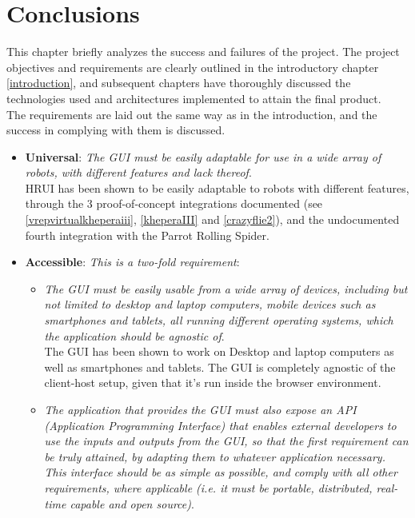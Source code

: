 \chapter{Conclusions} \label{conclusions}
This chapter briefly analyzes the success and failures of the project. The project objectives and requirements are clearly 
outlined in the introductory chapter \ref{introduction}, and subsequent chapters have thoroughly discussed the technologies 
used and architectures implemented to attain the final product.\\

The requirements are laid out the same way as in the introduction, and the success in complying with them is discussed.
\begin{itemize}
	\item \textbf{Universal}: \textit{The GUI must be easily adaptable for use in a wide array of robots, with different 
	features and lack thereof}.\\

	HRUI has been shown to be easily adaptable to robots with different features, through the 3 proof-of-concept 
	integrations documented (see \ref{vrepvirtualkheperaiii}, \ref{kheperaIII} and \ref{crazyflie2}), and the undocumented 
	fourth integration with the Parrot Rolling Spider.\\

	\item \textbf{Accessible}: \textit{This is a two-fold requirement}:
	\begin{itemize}
		\item \textit{The GUI must be easily usable from a wide array of devices, including but not limited to desktop and 
		laptop computers, mobile devices such as smartphones and tablets, all running different operating systems, which 
		the application should be agnostic of}.\\

		The GUI has been shown to work on Desktop and laptop computers as well as smartphones and tablets. The GUI is 
		completely agnostic of the client-host setup, given that it's run inside the browser environment.\\

		\item \textit{The application that provides the GUI must also expose an API (Application Programming Interface) 
		that enables external developers to use the inputs and outputs from the GUI, so that the first requirement can be 
		truly attained, by adapting them to whatever application necessary. This interface should be as simple as possible, 
		and comply with all other requirements, where applicable (i.e. it must be portable, distributed, real-time capable 
		and open source)}.\\


\end{itemize}
\end{itemize}
